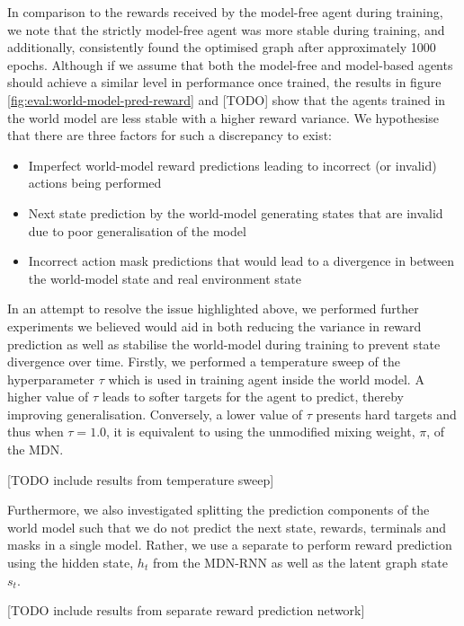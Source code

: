 In comparison to the rewards received by the model-free agent during training, we note that the strictly model-free agent was more stable during training, and additionally, consistently found the optimised graph after approximately 1000 epochs. Although if we assume that both the model-free and model-based agents should achieve a similar level in performance once trained, the results in figure \ref{fig:eval:world-model-pred-reward} and [TODO] show that the agents trained in the world model are less stable with a higher reward variance. We hypothesise that there are three factors for such a discrepancy to exist:

\begin{itemize}
  \item Imperfect world-model reward predictions leading to incorrect (or invalid) actions being performed
  \item Next state prediction by the world-model generating states that are invalid due to poor generalisation of the model
  \item Incorrect action mask predictions that would lead to a divergence in between the world-model state and real environment state 
\end{itemize}

In an attempt to resolve the issue highlighted above, we performed further experiments we believed would aid in both reducing the variance in reward prediction as well as stabilise the world-model during training to prevent state divergence over time. Firstly, we performed a temperature sweep of the hyperparameter $\tau$ which is used in training agent inside the world model. A higher value of $\tau$ leads to softer targets for the agent to predict, thereby improving generalisation. Conversely, a lower value of $\tau$ presents hard targets and thus when $\tau = 1.0$, it is equivalent to using the unmodified mixing weight, $\pi$, of the MDN.   

[TODO include results from temperature sweep]

Furthermore, we also investigated splitting the prediction components of the world model such that we do not predict the next state, rewards, terminals and masks in a single model. Rather, we use a separate to perform reward prediction using the hidden state, $h_t$ from the MDN-RNN as well as the latent graph state $s_t$.

[TODO include results from separate reward prediction network]


